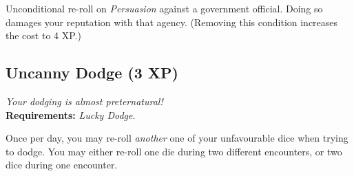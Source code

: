 Unconditional re-roll on \textit{Persuasion} against a government official.
Doing so damages your reputation with that agency.
(Removing this condition increases the cost to 4 XP.)

\subsection*{Uncanny Dodge (3 XP)}
\textit{Your dodging is almost preternatural!}\\
\textbf{Requirements:} \textit{Lucky Dodge}.

Once per day, you may re-roll \textit{another} one of your unfavourable dice when trying to dodge.
You may either re-roll one die during two different encounters, or two dice during one encounter.
